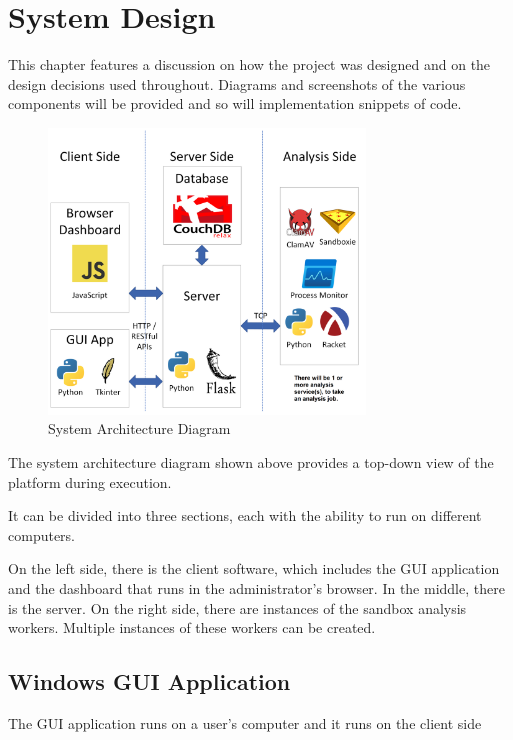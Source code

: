 \chapter{System Design}

This chapter features a discussion on how the project was designed
and on the design decisions used throughout.
Diagrams and screenshots of the various components will be provided
and so will implementation snippets of code.

\begin{figure}[h!]
    \centering
    \includegraphics[width=0.75\textwidth]{images/diagrams/architecture}
    \caption{System Architecture Diagram}
    \label{image:sysArchitecture}
\end{figure}

The system architecture diagram shown above provides
a top-down view of the platform during execution.

It can be divided into three sections,
each with the ability to run on different computers.

On the left side, there is the client software,
which includes the GUI application and the dashboard
that runs in the administrator's browser.
In the middle, there is the server. On the right side,
there are instances of the sandbox analysis workers.
Multiple instances of these workers can be created.

\section{Windows GUI Application}
The GUI application runs on a user's computer
and it runs on the client side

